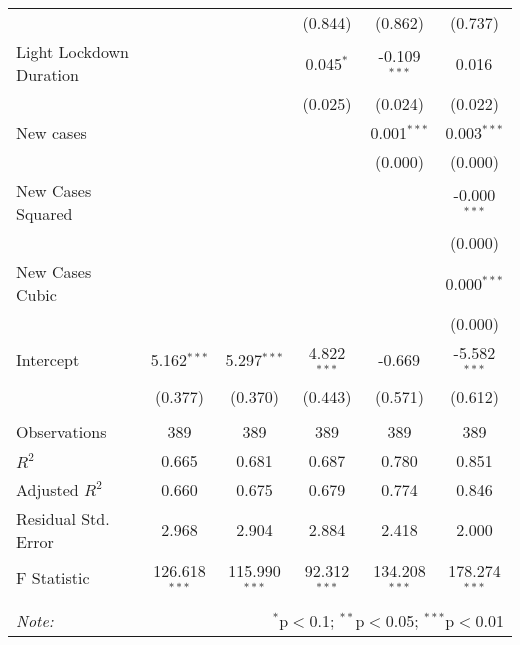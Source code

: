 \begin{tabular}{@{\extracolsep{5pt}}lccccc}
  & & & (0.844) & (0.862) & (0.737) \\
 Light Lockdown Duration & & & 0.045$^{*}$ & -0.109$^{***}$ & 0.016$^{}$ \\
  & & & (0.025) & (0.024) & (0.022) \\
 New cases & & & & 0.001$^{***}$ & 0.003$^{***}$ \\
  & & & & (0.000) & (0.000) \\
 New Cases Squared & & & & & -0.000$^{***}$ \\
  & & & & & (0.000) \\
 New Cases Cubic & & & & & 0.000$^{***}$ \\
  & & & & & (0.000) \\
 Intercept & 5.162$^{***}$ & 5.297$^{***}$ & 4.822$^{***}$ & -0.669$^{}$ & -5.582$^{***}$ \\
  & (0.377) & (0.370) & (0.443) & (0.571) & (0.612) \\
\hline \\[-1.8ex]
 Observations & 389 & 389 & 389 & 389 & 389 \\
 $R^2$ & 0.665 & 0.681 & 0.687 & 0.780 & 0.851 \\
 Adjusted $R^2$ & 0.660 & 0.675 & 0.679 & 0.774 & 0.846 \\
 Residual Std. Error & 2.968 & 2.904 & 2.884 & 2.418 & 2.000  \\
 F Statistic & 126.618$^{***}$  & 115.990$^{***}$  & 92.312$^{***}$  & 134.208$^{***}$  & 178.274$^{***}$  \\
\hline
\hline \\[-1.8ex]
\textit{Note:} & \multicolumn{5}{r}{$^{*}$p$<$0.1; $^{**}$p$<$0.05; $^{***}$p$<$0.01} \\
\end{tabular}
